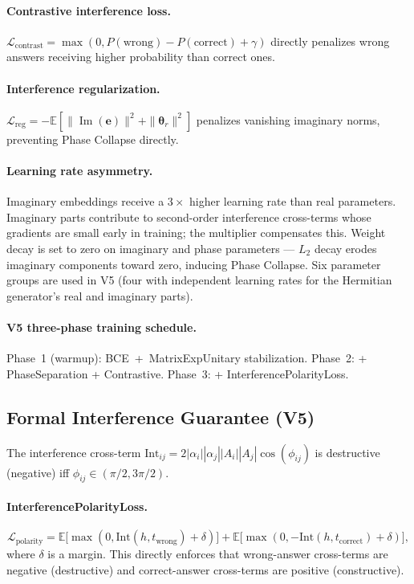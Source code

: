 \documentclass[runningheads]{llncs}
\begin{document}
\paragraph{Contrastive interference loss.}
$\mathcal{L}_\text{contrast}=\max(0,P(\text{wrong})-P(\text{correct})+\gamma)$
directly penalizes wrong answers receiving higher probability than correct ones.

\paragraph{Interference regularization.}
$\mathcal{L}_\text{reg}=-\mathbb{E}[\|\operatorname{Im}(\mathbf{e})\|^2+\|\bm\theta_r\|^2]$
penalizes vanishing imaginary norms, preventing Phase Collapse directly.

\paragraph{Learning rate asymmetry.}
Imaginary embeddings receive a $3\times$ higher learning rate than real
parameters.  Imaginary parts contribute to second-order interference
cross-terms whose gradients are small early in training; the multiplier
compensates this.  Weight decay is set to zero on imaginary and phase
parameters --- $L_2$ decay erodes imaginary components toward zero, inducing
Phase Collapse.  Six parameter groups are used in V5 (four with independent
learning rates for the Hermitian generator's real and imaginary parts).

\paragraph{V5 three-phase training schedule.}
Phase~1 (warmup): BCE~+~MatrixExpUnitary stabilization.
Phase~2: + PhaseSeparation + Contrastive.
Phase~3: + InterferencePolarityLoss.

\subsection{Formal Interference Guarantee (V5)}
\label{sec:v5}

\begin{lemma}
\label{lem:v51}
The interference cross-term
$\mathrm{Int}_{ij}=2|\alpha_i||\alpha_j||A_i||A_j|\cos(\phi_{ij})$
is destructive (negative) iff $\phi_{ij}\in(\pi/2,3\pi/2)$.
\end{lemma}

\paragraph{InterferencePolarityLoss.}
\begin{equation}
  \mathcal{L}_\text{polarity}
  = \mathbb{E}\bigl[\max(0,\mathrm{Int}(h,t_\text{wrong})+\delta)\bigr]
  + \mathbb{E}\bigl[\max(0,-\mathrm{Int}(h,t_\text{correct})+\delta)\bigr],
  \label{eq:polarity}
\end{equation}
where $\delta$ is a margin.  This directly enforces that wrong-answer
cross-terms are negative (destructive) and correct-answer cross-terms are
positive (constructive).
\end{document}
